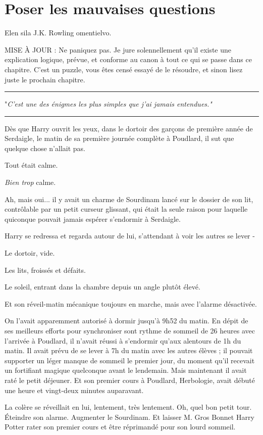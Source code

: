 
\chapter{Poser les mauvaises questions}

Elen sila J.K. Rowling omentielvo.

MISE À JOUR : Ne paniquez pas. Je jure solennellement qu'il existe une explication logique, prévue, et conforme au canon à tout ce qui se passe dans ce chapitre. C'est un puzzle, vous êtes censé essayé de le résoudre, et sinon lisez juste le prochain chapitre.
\par\noindent\rule{\textwidth}{0.4pt}
"\emph{C'est une des énigmes les plus simples que j'ai jamais entendues."} 
\par\noindent\rule{\textwidth}{0.4pt}
Dès que Harry ouvrit les yeux, dans le dortoir des garçons de première année de Serdaigle, le matin de sa première journée complète à Poudlard, il sut que quelque chose n'allait pas.

Tout était calme.

\emph{Bien trop}  calme.

Ah, mais oui... il y avait un charme de Sourdinam lancé sur le dossier de son lit, contrôlable par un petit curseur glissant, qui était la seule raison pour laquelle quiconque pouvait jamais espérer s'endormir à Serdaigle.

Harry se redressa et regarda autour de lui, s'attendant à voir les autres se lever -

Le dortoir, vide.

Les lits, froissés et défaits.

Le soleil, entrant dans la chambre depuis un angle plutôt élevé.

Et son réveil-matin mécanique toujours en marche, mais avec l'alarme désactivée.

On l'avait apparemment autorisé à dormir jusqu'à 9h52 du matin. En dépit de ses meilleurs efforts pour synchroniser sont rythme de sommeil de 26 heures avec l'arrivée à Poudlard, il n'avait réussi à s'endormir qu'aux alentours de 1h du matin. Il avait prévu de se lever à 7h du matin avec les autres élèves ; il pouvait supporter un léger manque de sommeil le premier jour, du moment qu'il recevait un fortifiant magique quelconque avant le lendemain. Mais maintenant il avait raté le petit déjeuner. Et son premier cours à Poudlard, Herbologie, avait débuté une heure et vingt-deux minutes auparavant.

La colère se réveillait en lui, lentement, très lentement. Oh, quel bon petit tour. Éteindre son alarme. Augmenter le Sourdinam. Et laisser M. Gros Bonnet Harry Potter rater son premier cours et être réprimandé pour son lourd sommeil.

